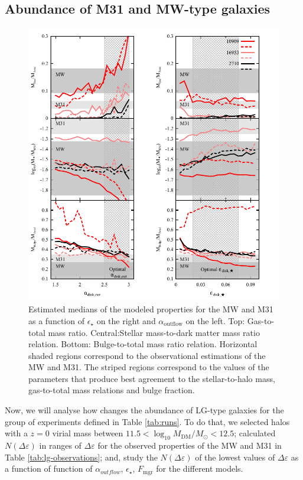 \documentclass[usenatbib]{mn2e}
\begin{document}
\subsection{Abundance of M31 and MW-type galaxies}
\begin{figure}
\includegraphics{figures/LG/LG-props-params-multi-v2.pdf} \caption{Estimated
  medians of the modeled properties for the MW and M31 as a function
  of $\epsilon_{\star}$ on the right and $\alpha_{\text{outflow}}$ on
  the left. Top: Gas-to-total mass ratio. Central:Stellar mass-to-dark
  matter mass ratio relation.  Bottom: Bulge-to-total mass ratio
  relation. Horizontal shaded regions correspond to the observational
  estimations of the MW and M31. The striped regions correspond to the
  values of the parameters that produce best agreement to the
  stellar-to-halo mass, gas-to-total mass relations and bulge
  fraction. 
\label{fig:properties-runs-LG}}
\end{figure}

Now, we will analyse how changes the abundance of LG-type galaxies for
the group of experiments defined in Table \ref{tab:runs}. To do that,
we selected halos with a $z=0$ virial mass between  $11.5<\log_{10}
M_{\text{DM}}/M_{\odot}<12.5$; calculated $N(\Delta\varepsilon)$ in
ranges  of $\Delta\varepsilon$ for the observed properties of the MW
and M31 in Table \ref{tab:lg-observations}; and, study the
$N(\Delta\varepsilon)$ of the lowest values of $\Delta\varepsilon$ as
a function of function of $\alpha_{outflow}$, $\epsilon_{\star}$,
$F_{\text{mgr}}$ for the different models. 
\end{document}
